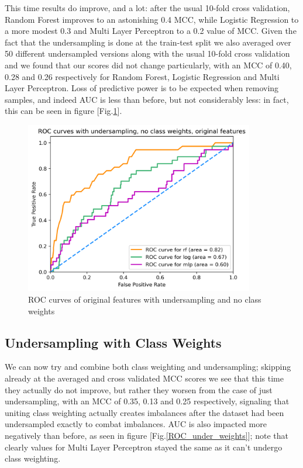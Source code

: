 \documentclass[a4paper,11pt]{article}
\begin{document}
This time results do improve, and a lot: after the usual 10-fold cross validation, Random Forest improves to an astonishing 0.4 MCC, while Logistic Regression to a more modest 0.3 and Multi Layer Perceptron to a 0.2 value of MCC. Given the fact that the undersampling is done at the train-test split we also averaged over 50 different undersampled versions along with the usual 10-fold cross validation and we found that our scores did not change particularly, with an MCC of 0.40, 0.28 and 0.26 respectively for Random Forest, Logistic Regression and Multi Layer Perceptron. 
Loss of predictive power is to be expected when removing samples, and indeed AUC is less than before, but not considerably less: in fact, this can be seen in figure [Fig.\ref{ROC_under_noweights}].

\begin{figure}[H]
  \centering
        \includegraphics[width=10cm]{ROC_undersampling_noweights.png}
 \caption{ROC curves of original features with undersampling and no class weights}
 \label{ROC_under_noweights}
\end{figure}

\subsection{Undersampling with Class Weights}
We can now try and combine both class weighting and undersampling; skipping already at the averaged and cross validated MCC scores we see that this time they actually do not improve, but rather they worsen from the case of just undersampling, with an MCC of 0.35, 0.13 and 0.25 respectively, signaling that uniting class weighting actually creates imbalances after the dataset had been undersampled exactly to combat imbalances. AUC is also impacted more negatively than before, as seen in figure [Fig.\ref{ROC_under_weights}]; note that clearly values for Multi Layer Perceptron stayed the same as it can't undergo class weighting.
\end{document}
